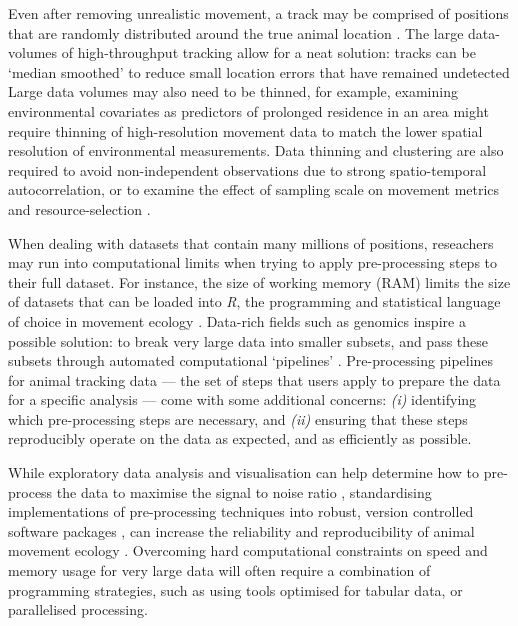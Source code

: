 \begin{refsection}[sorting=nyt]
    Even after removing unrealistic movement, a track may be comprised of positions that are randomly distributed around the true animal location \citep{noonan2019}.
    The large data-volumes of high-throughput tracking allow for a neat solution: tracks can be `median smoothed' to reduce small location errors that have remained undetected \citep[e.g.][]{bijleveld2016} 
    Large data volumes may also need to be thinned, for example, examining environmental covariates as predictors of prolonged residence in an area  \citep[see e.g.][]{bracis2018, aarts2008, bijleveld2016, oudman2018, harel2016} might require thinning of high-resolution movement data to match the lower spatial resolution of environmental measurements. 
    Data thinning and clustering are also required to avoid non-independent observations due to strong spatio-temporal autocorrelation, or to examine the effect of sampling scale on movement metrics and resource-selection \citep{fleming2014a,noonan2019}.

    When dealing with datasets that contain many millions of positions, reseachers may run into computational limits when trying to apply pre-processing steps to their full dataset.
    For instance, the size of working memory (RAM) limits the size of datasets that can be loaded into \textit{R}, the programming and statistical language of choice in movement ecology \citep{r2020,joo2020,joo2020b}.
    Data-rich fields such as genomics inspire a possible solution: to break very large data into smaller subsets, and pass these subsets through automated computational `pipelines' \citep{schadt2010,peng2011}.
    Pre-processing pipelines for animal tracking data --- the set of steps that users apply to prepare the data for a specific analysis --- come with some additional concerns: \textit{(i)} identifying which pre-processing steps are necessary, and \textit{(ii)} ensuring that these steps reproducibly operate on the data as expected, and as efficiently as possible.

    While exploratory data analysis and visualisation can help determine how to pre-process the data to maximise the signal to noise ratio \citep{slingsby2016}, standardising implementations of pre-processing techniques into robust, version controlled software packages \citep[e.g. in \textit{R}, see]{wickham2015}, can increase the reliability and reproducibility of animal movement ecology \citep{haddaway2015,archmiller2020,powers2019,lewis2018}.
    Overcoming hard computational constraints on speed and memory usage for very large data will often require a combination of programming strategies, such as using tools optimised for tabular data, or parallelised processing.


\end{refsection}
